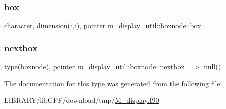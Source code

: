 \subsubsection{\texorpdfstring{box}{box}}
{\footnotesize\ttfamily \hyperlink{option__stopwatch_83_8txt_abd4b21fbbd175834027b5224bfe97e66}{character}, dimension(\+:,\+:), pointer m\+\_\+display\+\_\+util\+::boxnode\+::box\hspace{0.3cm}{\ttfamily [private]}}

\mbox{\label{structm__display__util_1_1boxnode_a66de6cb2ce074d35d978a4ac8f3bd29e}} 
\subsubsection{\texorpdfstring{nextbox}{nextbox}}
{\footnotesize\ttfamily \hyperlink{stop__watch_83_8txt_a70f0ead91c32e25323c03265aa302c1c}{type}(\hyperlink{structm__display__util_1_1boxnode}{boxnode}), pointer m\+\_\+display\+\_\+util\+::boxnode\+::nextbox =$>$ null()\hspace{0.3cm}{\ttfamily [private]}}



The documentation for this type was generated from the following file\+:\begin{DoxyCompactItemize}
\item 
L\+I\+B\+R\+A\+R\+Y/lib\+G\+P\+F/download/tmp/\hyperlink{M__display_8f90}{M\+\_\+display.\+f90}\end{DoxyCompactItemize}
